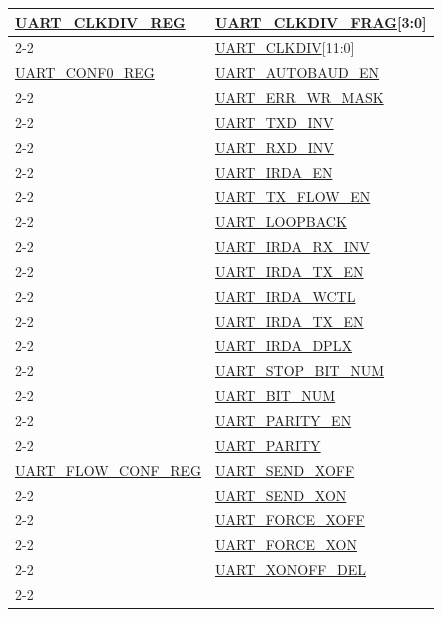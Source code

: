 \documentclass[main\_\_EN.tex]{subfiles}
\begin{document}
\begin{longtable}[c]{|m{6cm}|m{6cm}|}
\hyperref[regdesc:UARTCLKDIVREG]{UART\_CLKDIV\_REG} & \hyperref[fielddesc:UARTCLKDIVFRAG]{UART\_CLKDIV\_FRAG}[3:0] \\\cline{2-2}
 & \hyperref[fielddesc:UARTCLKDIV]{UART\_CLKDIV}[11:0] \\\hline
\hyperref[regdesc:UARTCONF0REG]{UART\_CONF0\_REG}  & \hyperref[fielddesc:UARTAUTOBAUDEN]{UART\_AUTOBAUD\_EN} \\\cline{2-2}
 & \hyperref[fielddesc:UARTERRWRMASK]{UART\_ERR\_WR\_MASK} \\\cline{2-2}
 & \hyperref[fielddesc:UARTTXDINV]{UART\_TXD\_INV} \\\cline{2-2}
 & \hyperref[fielddesc:UARTRXDINV]{UART\_RXD\_INV} \\\cline{2-2}
 & \hyperref[fielddesc:UARTIRDAEN]{UART\_IRDA\_EN} \\\cline{2-2}
 & \hyperref[fielddesc:UARTTXFLOWEN]{UART\_TX\_FLOW\_EN} \\\cline{2-2}
 & \hyperref[fielddesc:UARTLOOPBACK]{UART\_LOOPBACK} \\\cline{2-2}
 & \hyperref[fielddesc:UARTIRDARXINV]{UART\_IRDA\_RX\_INV} \\\cline{2-2}
 & \hyperref[fielddesc:UARTIRDATXEN]{UART\_IRDA\_TX\_EN} \\\cline{2-2}
 & \hyperref[fielddesc:UARTIRDAWCTL]{UART\_IRDA\_WCTL} \\\cline{2-2}
 & \hyperref[fielddesc:UARTIRDATXEN]{UART\_IRDA\_TX\_EN} \\\cline{2-2}
 & \hyperref[fielddesc:UARTIRDADPLX]{UART\_IRDA\_DPLX} \\\cline{2-2}
 & \hyperref[fielddesc:UARTSTOPBITNUM]{UART\_STOP\_BIT\_NUM} \\\cline{2-2}
 & \hyperref[fielddesc:UARTBITNUM]{UART\_BIT\_NUM} \\\cline{2-2}
 & \hyperref[fielddesc:UARTPARITYEN]{UART\_PARITY\_EN} \\\cline{2-2}
 & \hyperref[fielddesc:UARTPARITY]{UART\_PARITY} \\\hline
\hyperref[regdesc:UARTFLOWCONFREG]{UART\_FLOW\_CONF\_REG}  & \hyperref[fielddesc:UARTSENDXOFF]{UART\_SEND\_XOFF} \\\cline{2-2}
 & \hyperref[fielddesc:UARTSENDXON]{UART\_SEND\_XON} \\\cline{2-2}
 & \hyperref[fielddesc:UARTFORCEXOFF]{UART\_FORCE\_XOFF} \\\cline{2-2}
 & \hyperref[fielddesc:UARTFORCEXON]{UART\_FORCE\_XON} \\\cline{2-2}
 & \hyperref[fielddesc:UARTXONOFFDEL]{UART\_XONOFF\_DEL} \\\cline{2-2}

\end{longtable}
\end{document}
